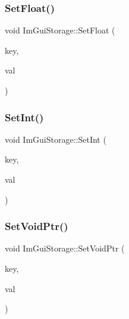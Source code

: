\hypertarget{struct_im_gui_storage_ab531d90a0e5a1a2453e351c499149756}{}\label{struct_im_gui_storage_ab531d90a0e5a1a2453e351c499149756} 
\subsubsection{\texorpdfstring{Set\+Float()}{SetFloat()}}
{\footnotesize\ttfamily void Im\+Gui\+Storage\+::\+Set\+Float (\begin{DoxyParamCaption}\item[{Im\+Gui\+ID}]{key,  }\item[{float}]{val }\end{DoxyParamCaption})}

\hypertarget{struct_im_gui_storage_af83975ca841a9bd0e06a6ea0a41bf159}{}\label{struct_im_gui_storage_af83975ca841a9bd0e06a6ea0a41bf159} 
\subsubsection{\texorpdfstring{Set\+Int()}{SetInt()}}
{\footnotesize\ttfamily void Im\+Gui\+Storage\+::\+Set\+Int (\begin{DoxyParamCaption}\item[{Im\+Gui\+ID}]{key,  }\item[{int}]{val }\end{DoxyParamCaption})}

\hypertarget{struct_im_gui_storage_a55f840086b3ec9cf63c67f02d159204a}{}\label{struct_im_gui_storage_a55f840086b3ec9cf63c67f02d159204a} 
\subsubsection{\texorpdfstring{Set\+Void\+Ptr()}{SetVoidPtr()}}
{\footnotesize\ttfamily void Im\+Gui\+Storage\+::\+Set\+Void\+Ptr (\begin{DoxyParamCaption}\item[{Im\+Gui\+ID}]{key,  }\item[{void $\ast$}]{val }\end{DoxyParamCaption})}



